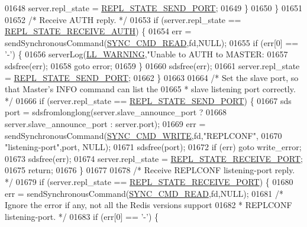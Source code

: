 \begin{DoxyCode}
{{{{{{{{{{{{{{{{{{{{{{{{{{{{{{{{{{{{{{{{{{{{{{{{{{{{{{{{{{{{01648             server.repl\_state = \hyperlink{server_8h_a85992c63bed9483320b32c54c110ed80}{REPL\_STATE\_SEND\_PORT};
01649         \}
01650     \}
01651 
01652     \textcolor{comment}{/* Receive AUTH reply. */}
01653     \textcolor{keywordflow}{if} (server.repl\_state == \hyperlink{server_8h_a927236ee88a2420450021c4ab3d0e0d3}{REPL\_STATE\_RECEIVE\_AUTH}) \{
01654         err = sendSynchronousCommand(\hyperlink{replication_8c_a5dde0948d622fc1b0327b0d49cb3cef5}{SYNC\_CMD\_READ},fd,NULL);
01655         \textcolor{keywordflow}{if} (err[0] == \textcolor{stringliteral}{'-'}) \{
01656             serverLog(\hyperlink{server_8h_a31229b9334bba7d6be2a72970967a14b}{LL\_WARNING},\textcolor{stringliteral}{"Unable to AUTH to MASTER: %
01657             sdsfree(err);
01658             \textcolor{keywordflow}{goto} error;
01659         \}
01660         sdsfree(err);
01661         server.repl\_state = \hyperlink{server_8h_a85992c63bed9483320b32c54c110ed80}{REPL\_STATE\_SEND\_PORT};
01662     \}
01663 
01664     \textcolor{comment}{/* Set the slave port, so that Master's INFO command can list the}
01665 \textcolor{comment}{     * slave listening port correctly. */}
01666     \textcolor{keywordflow}{if} (server.repl\_state == \hyperlink{server_8h_a85992c63bed9483320b32c54c110ed80}{REPL\_STATE\_SEND\_PORT}) \{
01667         sds port = sdsfromlonglong(server.slave\_announce\_port ?
01668             server.slave\_announce\_port : server.port);
01669         err = sendSynchronousCommand(\hyperlink{replication_8c_aa4480c458f209657b59d476157d44aab}{SYNC\_CMD\_WRITE},fd,\textcolor{stringliteral}{"REPLCONF"},
01670                 \textcolor{stringliteral}{"listening-port"},port, NULL);
01671         sdsfree(port);
01672         \textcolor{keywordflow}{if} (err) \textcolor{keywordflow}{goto} write\_error;
01673         sdsfree(err);
01674         server.repl\_state = \hyperlink{server_8h_abdf6b7d97826598c4c9176141b712c2c}{REPL\_STATE\_RECEIVE\_PORT};
01675         \textcolor{keywordflow}{return};
01676     \}
01677 
01678     \textcolor{comment}{/* Receive REPLCONF listening-port reply. */}
01679     \textcolor{keywordflow}{if} (server.repl\_state == \hyperlink{server_8h_abdf6b7d97826598c4c9176141b712c2c}{REPL\_STATE\_RECEIVE\_PORT}) \{
01680         err = sendSynchronousCommand(\hyperlink{replication_8c_a5dde0948d622fc1b0327b0d49cb3cef5}{SYNC\_CMD\_READ},fd,NULL);
01681         \textcolor{comment}{/* Ignore the error if any, not all the Redis versions support}
01682 \textcolor{comment}{         * REPLCONF listening-port. */}
01683         \textcolor{keywordflow}{if} (err[0] == \textcolor{stringliteral}{'-'}) \{
}}}}}}}}}}}}}}}}}}}}}}}}}}}}}}}}}}}}}}}}}}}}}}}}}}}}}}}}}}}}}
\end{DoxyCode}
